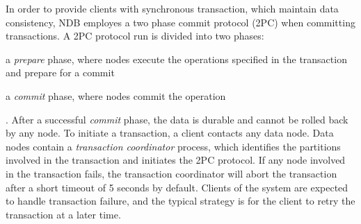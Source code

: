 In order to provide clients with synchronous transaction, which maintain data consistency, NDB employes a two phase commit protocol (2PC) when committing transactions.
A 2PC protocol run is divided into two phases: \begin{inparaenum}
    \item a \emph{prepare} phase, where nodes execute the operations specified in the transaction and prepare for a commit
    \item a \emph{commit} phase, where nodes commit the operation
\end{inparaenum}.
After a successful \emph{commit} phase, the data is durable and cannot be rolled back by any node.
To initiate a transaction, a client contacts any data node.
Data nodes contain a \emph{transaction coordinator} process, which identifies the partitions involved in the transaction and initiates the 2PC protocol.
If any node involved in the transaction fails, the transaction coordinator will abort the transaction after a short timeout of 5 seconds by default.
Clients of the system are expected to handle transaction failure, and the typical strategy is for the client to retry the transaction at a later time.

